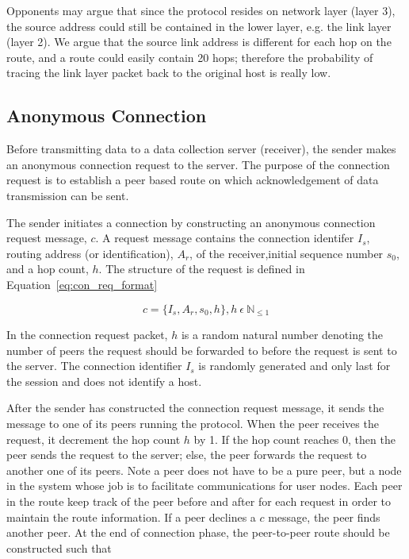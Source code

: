 Opponents may argue that since the protocol resides on network layer (layer 3),
the source address could still be contained in the lower layer, e.g. the link
layer (layer 2). We argue that the source link address is different for
each hop on the route, and a route could easily contain 20 hops; therefore
the probability of tracing the link layer packet back to the original host is
really low.

\subsection{Anonymous Connection}\label{anonymous_connection}

Before transmitting data to a data collection server (receiver), the
sender makes an anonymous connection request to the server. The purpose
of the connection request is to establish a peer based route on which
acknowledgement of data transmission can be sent.

The sender initiates a connection by constructing an anonymous
connection request message, $c$. A request message contains the
connection identifer $I_s$, routing
address (or identification), $A_r$, of the receiver,initial sequence
number $s_0$, and a hop count,
$h$. The structure of the request is defined in
Equation~\ref{eq:con_req_format}

\begin{equation}\label{eq:con_req_format}
c = \{I_s, A_r, s_0, h\}, h~\epsilon~\mathbb{N}_{\leq1}
\end{equation}

In the connection request packet, $h$ is a random natural number
denoting the number of peers the request should be forwarded to
before the request is sent to the server. The connection identifier $I_s$
is randomly generated and only last for the session and does not identify
a host.

After the sender has constructed the connection request message,
it sends the message to one of its peers running the protocol. When the
peer receives the request, it decrement the hop count $h$ by 1. If
the hop count reaches 0, then the peer sends the request to the server;
else, the peer forwards the request to another one of its peers. Note
a peer does not have to be a pure peer, but a node in the system whose
job is to facilitate communications for user nodes. Each peer in the
route keep track of the peer before and after for each request in order
to maintain the route information. If a peer declines a $c$ message,
the peer finds another peer. At the end of connection phase, the
peer-to-peer route should be constructed such that


